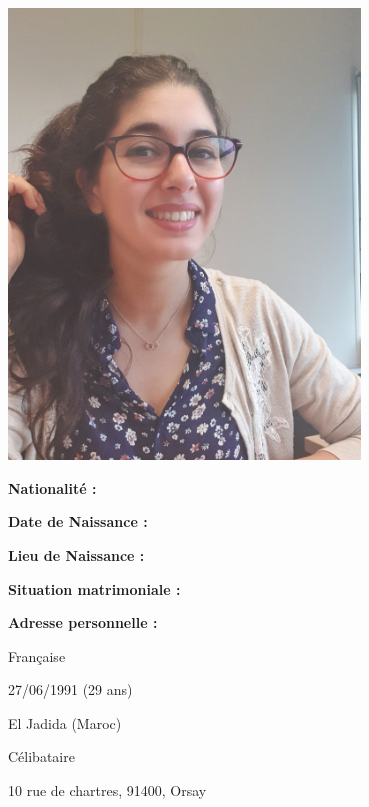 \begin{minipage}{0.2\textwidth}
	\includegraphics[width=0.7\textwidth]{Figures/photo_id.jpg}
\end{minipage}\hspace{-1.5cm}
\begin{minipage}{0.7\textwidth}
	\begin{minipage}{0.5\textwidth}
		\begin{flushright}
			\textbf{	Nationalité :}
			
			\textbf{	Date de Naissance :}
				
			\textbf{	Lieu de Naissance :}
				
			\textbf{	Situation matrimoniale :}
				
		\textbf{		Adresse personnelle :}
		\end{flushright}
	
	\end{minipage}\hspace{0.4cm}
	\begin{minipage}{0.6\textwidth}
		
			Française
			 
			 27/06/1991 (29 ans)
			
			El Jadida (Maroc)
			
			Célibataire
			
			10 rue de chartres, 91400, Orsay
	\end{minipage}

\end{minipage}

